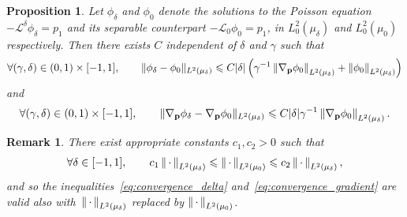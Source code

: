 \documentclass[11pt,a4paper]{article}
\newcommand{\dummy}{\,\cdot\,}
\newcommand{\grad}{\nabla}
\newcommand{\vect}[1]{\boldsymbol{\mathbf #1}}
\renewcommand{\d}{\mathrm d}
\theoremstyle{plain}
\newtheorem{proposition}[theorem]{Proposition}
\newtheorem{remark}{Remark}[section]
\numberwithin{equation}{section}
\renewcommand{\leq}{\leqslant}
\begin{document}
\begin{proposition}
    \label{proposition:convergence_gradient}
    Let $\phi_{\delta}$ and $\phi_0$ denote the solutions to the Poisson equation $- \mathcal L^{\delta} \phi_{\delta} = p_1$
    and its separable counterpart $- \mathcal L_0 \phi_0 = p_1$,
    in $L^2_0(\mu_{\delta})$ and $L^2_0(\mu_0)$ respectively.
    Then there exists $C$ independent of $\delta$ and $\gamma$ such that
    \begin{align}
        \label{eq:convergence_delta}
        \forall (\gamma, \delta) \in (0, 1) \times [-1, 1], \qquad
        \norm*{\phi_\delta - \phi_0}[L^2(\mu_{\delta})]
        \leq C\lvert \delta \rvert \left(
              \gamma^{-1} \norm{\grad_{\vect p} \phi_0}[L^2(\mu_{\delta})]
            + \norm{\phi_0}[L^2(\mu_{\delta})]
        \right)
    \end{align}
    and
    \begin{align}
        \label{eq:convergence_gradient}
        \forall (\gamma, \delta) \in (0, 1) \times [-1, 1], \qquad
        \norm*{\grad_{\vect p} \phi_\delta - \grad_{\vect p} \phi_0}[L^2(\mu_{\delta})]
        \leq C \lvert \delta \rvert  \gamma^{-1} \norm{\grad_{\vect p} \phi_0}[L^2(\mu_{\delta})] .
    \end{align}
\end{proposition}
\begin{remark}
    There exist appropriate constants $c_1, c_2 > 0$ such that
    \[
        \forall \delta \in [-1, 1], \qquad
        c_1 \norm{\dummy}[L^2(\mu_{\delta})] \leq \norm{\dummy}[L^2(\mu_0)] \leq c_2 \norm{\dummy}[L^2(\mu_{\delta})],
    \]
    and so the inequalities~\eqref{eq:convergence_delta} and~\eqref{eq:convergence_gradient} are valid also with~$\norm{\dummy}[L^2(\mu_{\delta})]$ replaced by $\norm{\dummy}[L^2(\mu_{0})]$.
\end{remark}
\end{document}
